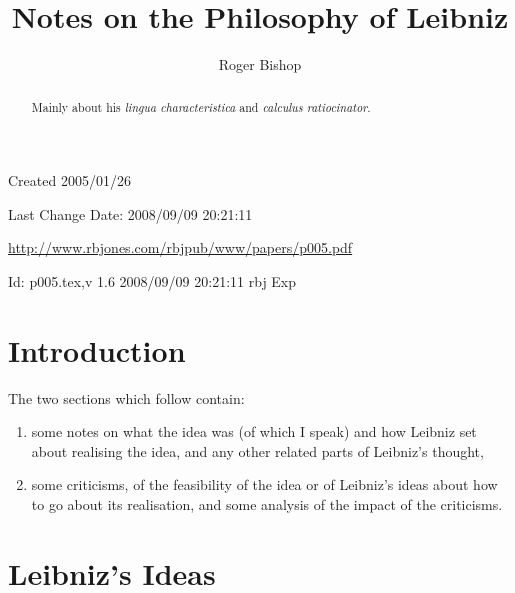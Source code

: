 \documentclass{rbjk}
\begin{document}
                                                                                   
\begin{article}
\begin{opening}  

\title{Notes on the Philosophy of Leibniz}
\author{Roger Bishop }

\begin{abstract}
Mainly about his {\it lingua characteristica} and {\it calculus ratiocinator}.
\end{abstract}
\end{opening}


\vfill

\begin{centering}
\footnotesize{
Created 2005/01/26

Last Change $ $Date: 2008/09/09 20:21:11 $ $

\href{http://www.rbjones.com/rbjpub/www/papers/p005.pdf}{http://www.rbjones.com/rbjpub/www/papers/p005.pdf}

$ $Id: p005.tex,v 1.6 2008/09/09 20:21:11 rbj Exp $ $\\

}%
\end{centering}

\newpage
\setcounter{tocdepth}{4}
{\parskip-0pt\tableofcontents}

\section{Introduction}

The two sections which follow contain:

\begin{enumerate}
\item some notes on what the idea was (of which I speak) and how Leibniz set about realising the idea, and any other related parts of Leibniz's thought,
\item some criticisms, of the feasibility of the idea or of Leibniz's ideas about how to go about its realisation, and some analysis of the impact of the criticisms.
\end{enumerate}

\section{Leibniz's Ideas}


\end{article}
\end{document}
